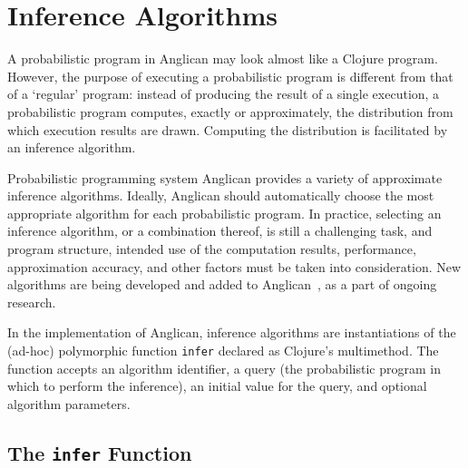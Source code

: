 \documentclass[preprint]{sigplanconf}
\begin{document}
\section{Inference Algorithms}
\label{sec:inference}

A probabilistic program in Anglican may look almost like a
Clojure program. However, the purpose of executing a
probabilistic program is different from that of a `regular'
program: instead of producing the result of a single execution,
a probabilistic program computes, exactly or approximately, the
distribution from which execution results are drawn.  Computing
the distribution is facilitated by an inference algorithm.

Probabilistic programming system Anglican provides a variety of
approximate inference algorithms. Ideally, Anglican should
automatically choose the most appropriate algorithm for each
probabilistic program. In practice, selecting an inference
algorithm, or a combination thereof, is still a challenging
task, and program structure, intended use of the computation
results, performance, approximation accuracy, and other factors
must be taken into consideration. New algorithms are being
developed and added to Anglican~\cite{TMP+15,MPT+16,RNL+2016},
as a part of ongoing research.

In the implementation of Anglican, inference algorithms are
instantiations of the (ad-hoc) polymorphic function
\texttt{infer} declared as Clojure's multimethod\iftoggle{full}{
in the \texttt{anglican.{\linebreak[0]}inference}
namespace}{}. The function accepts an algorithm identifier,
a query (the probabilistic program in which to perform the
inference), an initial value for the query, and optional
algorithm parameters.

\subsection{The \texttt{infer} Function}
\label{sec:infer}
\end{document}
